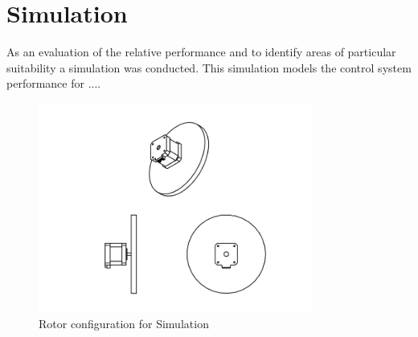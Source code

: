 \documentclass{article}
\begin{document}
\section{Simulation}
As an evaluation of the relative performance and to identify areas of particular suitability a simulation was conducted. This simulation models the control system performance for .... 

\begin{figure}[h!]
  \centering
  \includegraphics[width=0.8\textwidth]{simulation.png}
  \captionsetup{justification=centering}
  \caption{Rotor configuration for Simulation}
   \label{fig:sim}
\end{figure}
\end{document}
